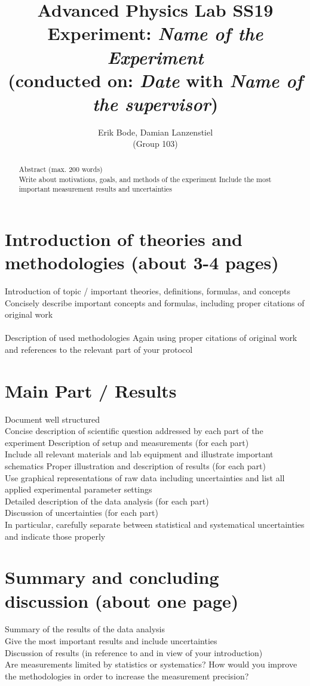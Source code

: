 \documentclass[30pt,a4paper]{article}
\title{
	\large Advanced Physics Lab	SS19 \\[4mm]
	\textbf{\LARGE Experiment: \emph{\color{red}Name of the Experiment}
	} \\[4mm]
	(conducted on: \emph{\color{red}Date} with \emph{\color{red}Name of the supervisor}) \\}
\author{Erik Bode, Damian Lanzenstiel \\ (Group 103)}
\begin{document}
	
	\begin{titlepage}
	\maketitle
	\vspace{2cm}
	\begin{abstract}
	\color{red}
	Abstract (max. 200 words)\\
	\color{black}
	Write about motivations, goals, and methods of the experiment
	Include the most important measurement results and uncertainties
	\end{abstract}
	\end{titlepage}
	\newpage
	
	\tableofcontents
	\listoffigures
	\listoftables
	\newpage
	
	\section{Introduction of theories and methodologies \color{red}(about 3-4 pages)}
	Introduction of topic / important theories, definitions, formulas, and concepts
	Concisely describe important concepts and formulas, including proper citations of original work
	\\
	\ \\
	Description of used methodologies
	Again using proper citations of original work and references to the relevant part of your protocol
	\section{Main Part / Results}
	Document well structured\\
	Concise description of scientific question addressed by each part of the experiment
	Description of setup and measurements (for each part)\\
	Include all relevant materials and lab equipment and illustrate important schematics
	Proper illustration and description of results (for each part)\\
	Use graphical representations of raw data including uncertainties and list all applied experimental
	parameter settings\\
	Detailed description of the data analysis (for each part)\\
	Discussion of uncertainties (for each part)\\
	In particular, carefully separate between statistical and systematical uncertainties and indicate those
	properly
	\section{Summary and concluding discussion \color{red}(about one page)}
	Summary of the results of the data analysis\\
	Give the most important results and include uncertainties\\
	Discussion of results (in reference to and in view of your introduction)\\
	Are measurements limited by statistics or systematics? How would you improve the methodologies in
	order to increase the measurement precision?\\
\end{document}
